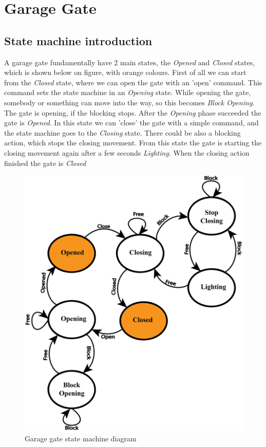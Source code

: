\chapter{Garage Gate}\label{sect:garage-gate-model}
\section{State machine introduction}

A garage gate fundamentally have 2 main states, the \textit{Opened} and \textit{Closed} states, which is shown below on  figure, with orange colours. First of all we can start from the \textit{Closed} state, where we can open the gate with an 'open' command. This command sets the state machine in an \textit{Opening} state. While opening the gate, somebody or something can move into the way, so this becomes \textit{Block Opening}. The gate is opening, if the blocking stops. After the \textit{Opening} phase succeeded the gate is \textit{Opened}. In this state we can 'close' the gate with a simple command, and the state machine goes to the \textit{Closing} state. There could be also a blocking action, which stops the closing movement. From this state the gate is starting the closing movement again after a few seconds \textit{Lighting}. When the closing action finished the gate is \textit{Closed}

\begin{figure}[!ht]
\centering
\includegraphics[width=150mm, keepaspectratio]{figures/garage.png}
\caption{Garage gate state machine diagram}
\label{fig:Garage Statemachine}
\end{figure}
